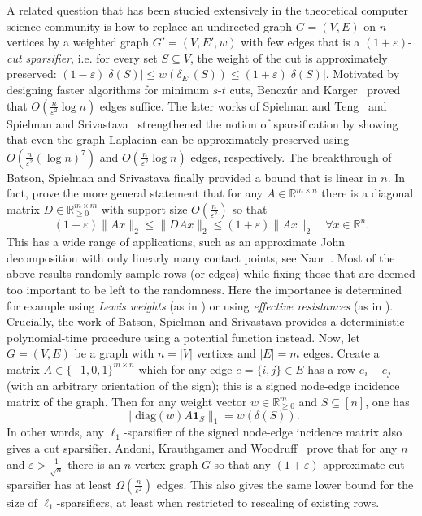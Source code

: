 \documentclass[12pt,english]{article}
\theoremstyle{theorem}
\theoremstyle{remark}
\providecommand{\setR}{\mathbb{R}}
\newcommand{\eps}{\varepsilon}
\begin{document}
A related question that has been studied extensively in the theoretical computer science community is how to replace an undirected graph $G = (V,E)$ on $n$ vertices by a weighted graph $G' = (V,E',w)$ with few edges that is a $(1+\eps)$-\textit{cut sparsifier}, i.e. for every set $S \subseteq V$, the weight of the cut is approximately preserved: $(1-\varepsilon) |\delta(S)| \leq w(\delta_{E'}(S)) \leq (1+\varepsilon) |\delta(S)|$. Motivated by designing faster algorithms for minimum $s$-$t$ cuts, Bencz\'ur and Karger~\cite{BenczurKargerSTOC96} proved that $O(\frac{n}{\varepsilon^2} \log n)$ edges suffice. The later works of Spielman and Teng~\cite{SpielmanTengSICOMP2011} and Spielman and Srivastava~\cite{SpielmanSrivastavaSICOMP2011} strengthened the notion of sparsification by showing that even the graph Laplacian can be approximately preserved using $O(\frac{n}{\varepsilon^2} (\log n)^7)$ and $O(\frac{n}{\varepsilon^2} \log n)$ edges, respectively. 
The breakthrough of Batson, Spielman and Srivastava \cite{BatsonSpielmanSrivastavaSTOC2009,BatsonSpielmanSrivastava2012} finally provided a bound that is  linear in $n$. In fact, \cite{BatsonSpielmanSrivastavaSTOC2009,BatsonSpielmanSrivastava2012} prove the more general statement that for any $A \in \setR^{m \times n}$ there is a diagonal matrix $D \in \setR_{\geq 0}^{m \times m}$  with support size $O(\frac{n}{\varepsilon^2})$ so that
\[
 (1-\varepsilon) \|Ax\|_2 \leq  \|DAx\|_2 \leq (1+\varepsilon) \|Ax\|_2 \quad \forall x \in \setR^n.
\]
This has a wide range of applications, such as an approximate John decomposition with only linearly many contact points, see Naor~\cite{SparseQuadraticFormsNaor2012}.
Most of the above results randomly sample rows (or edges) while fixing those that are deemed too important to be left to the randomness. Here the importance is determined for example using \emph{Lewis weights} (as in \cite{Talagrand1990,CohenPengSTOC2015}) or using \emph{effective resistances} (as in \cite{SpielmanSrivastavaSICOMP2011}). 
Crucially, the work of Batson, Spielman and Srivastava \cite{BatsonSpielmanSrivastavaSTOC2009,BatsonSpielmanSrivastava2012} provides a deterministic polynomial-time procedure using a potential function instead.
Now, let $G = (V,E)$ be a graph with $n = |V|$ vertices and $|E| = m$ edges. Create a matrix  $A \in \{ -1,0,1\}^{m \times n}$ which for any edge $e = \{ i,j\} \in E$ has a row $e_i - e_j$ (with an arbitrary orientation of the sign); this is a signed node-edge incidence matrix of the graph.
Then for any weight vector $w \in \setR_{\geq 0}^m$ and $S \subseteq [n]$, one has
\[
 \|\textrm{diag}(w) A \bm{1}_S\|_1 = w(\delta(S)).
\]
In other words, any $\ell_1$-sparsifier of the signed node-edge incidence matrix also gives a cut sparsifier. Andoni, Krauthgamer and Woodruff~\cite{AndoniKWGraphCuts2014} prove that for any $n$ and $\varepsilon > \frac{1}{\sqrt{n}}$ there is an $n$-vertex graph $G$ so that any $(1+\varepsilon)$-approximate cut sparsifier has at least $\Omega(\frac{n}{\varepsilon^2})$ edges. This also gives the same lower bound for the size of $\ell_1$-sparsifiers, at least when restricted to rescaling of existing rows.
\end{document}
